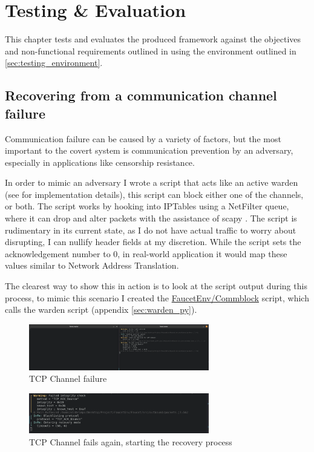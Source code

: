 \chapter{Testing & Evaluation}

This chapter tests and evaluates the produced framework against the objectives and non-functional requirements outlined in  using the environment outlined in \ref{sec:testing_environment}.

\section{Recovering from a communication channel failure}
\label{sec:detecting_and_recovering_from_failures}

Communication failure can be caused by a variety of factors, but the most important to the covert system is communication prevention by an adversary, especially in applications like censorship resistance.

In order to mimic an adversary I wrote a script that acts like an active warden (see  for implementation details), this script can block either one of the channels, or both. The script works by hooking into IPTables using a NetFilter queue, where it can drop and alter packets with the assistance of scapy \citep{scapy}. The script is rudimentary in its current state, as I do not have actual traffic to worry about disrupting, I can nullify header fields at my discretion. While the script sets the acknowledgement number to 0, in real-world application it would map these values similar to Network Address Translation.

The clearest way to show this in action is to look at the script output during this process, to mimic this scenario I created the \url{FaucetEnv/Commblock} script, which calls the warden script (appendix \ref{sec:warden_py}).

\begin{figure}[H]
    \centering
    \includegraphics[width=0.7\textwidth]{fig/TCP_Failure.png}
    \caption{TCP Channel failure}
    \label{fig:TCP_Failure}
\end{figure}

\begin{figure}[H]
    \centering
    \includegraphics[width=0.7\textwidth]{fig/TCP_Fail_into_rec.png}
    \caption{TCP Channel fails again, starting the recovery process}
    \label{fig:TCP_Failure_again}
\end{figure}

